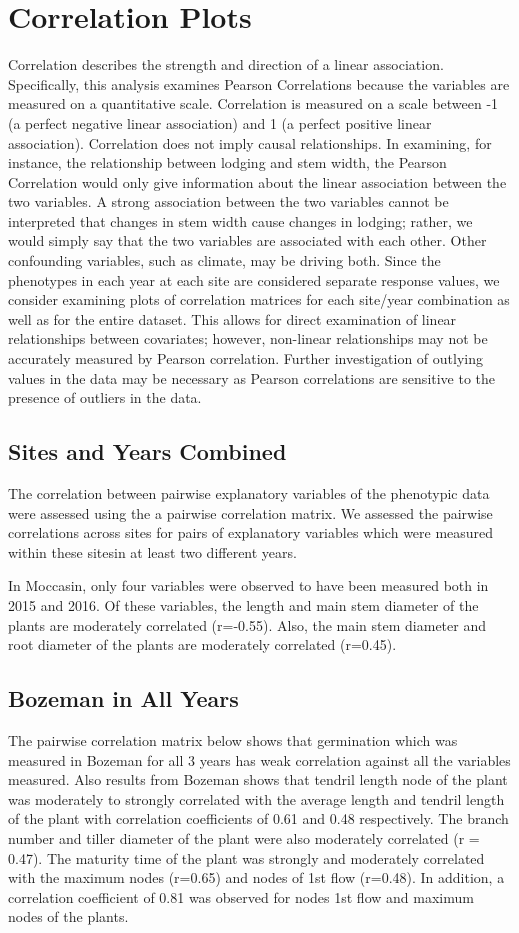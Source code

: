 \documentclass[11pt]{article}\usepackage[]{graphicx}\usepackage[]{color}
\begin{document}
\section{Correlation Plots}
Correlation describes the strength and direction of a linear association. Specifically, this analysis examines Pearson Correlations because the variables are measured on a quantitative scale.  Correlation is measured on a scale between -1 (a perfect negative linear association) and 1 (a perfect positive linear association). Correlation does not imply causal relationships. In examining, for instance, the relationship between lodging and stem width, the Pearson Correlation would only give information about the linear association between the two variables.  A strong association between the two variables cannot be interpreted that changes in stem width cause changes in lodging; rather, we would simply say that the two variables are associated with each other. Other confounding variables, such as climate, may be driving both. Since the phenotypes in each year at each site are considered separate response values, we consider examining plots of correlation matrices for each site/year combination as well as for the entire dataset. This allows for direct examination of linear relationships between covariates; however, non-linear relationships may not be accurately measured by Pearson correlation. Further investigation of outlying values in the data may be necessary as Pearson correlations are sensitive to the presence of outliers in the data. 

\subsection{Sites and Years Combined}
The correlation between pairwise explanatory variables of the phenotypic data were assessed using the a pairwise correlation matrix. We assessed the pairwise correlations across sites for pairs of explanatory variables which were measured within these sitesin at least two different years.

In Moccasin, only four variables were observed to have been measured both in 2015 and 2016. Of these variables, the length and main stem diameter of the plants are moderately correlated (r=-0.55). Also, the main stem diameter and root diameter of the plants are moderately correlated (r=0.45).
\pagebreak
\subsection{Bozeman in All Years}
The pairwise correlation matrix below shows that germination which was measured in Bozeman for all 3 years has weak correlation against all the variables measured. Also results from Bozeman shows that tendril length node of the plant was moderately to strongly correlated with the average length and tendril length of the plant with correlation coefficients of 0.61 and 0.48 respectively. The branch number and tiller diameter of the plant were also moderately correlated (r = 0.47). The maturity time of the plant was strongly and moderately correlated with the maximum nodes (r=0.65) and nodes of 1st flow (r=0.48). In addition, a correlation coefficient of 0.81 was observed for nodes 1st flow and maximum nodes of the plants.
\end{document}

